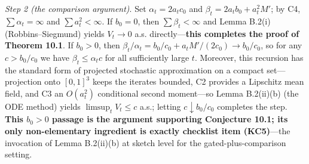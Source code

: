 \documentclass[
  11pt]{article}
\begin{document}
\emph{Step 2 (the comparison argument)}. Set \(\alpha_t = 2a_tc_0\) and
\(\beta_t = 2a_tb_0 + a_t^2 M'\); by C4, \(\sum\alpha_t = \infty\) and
\(\sum a_t^2 < \infty\). If \(b_0 = 0\), then \(\sum\beta_t < \infty\)
and Lemma B.2(i) (Robbins--Siegmund) yields \(V_t \to 0\) a.s.
directly---\textbf{this completes the proof of Theorem 10.1}. If
\(b_0 > 0\), then
\(\beta_t/\alpha_t = b_0/c_0 + a_tM'/(2c_0) \to b_0/c_0\), so for any
\(c > b_0/c_0\) we have \(\beta_t \le \alpha_t c\) for all sufficiently
large \(t\). Moreover, this recursion has the standard form of projected
stochastic approximation on a compact set---projection onto \([0,1]^3\)
keeps the iterates bounded, C2 provides a Lipschitz mean field, and C3
an \(O(a_t^2)\) conditional second moment---so Lemma B.2(ii)(b) (the ODE
method) yields \(\limsup_t V_t \le c\) a.s.; letting
\(c \downarrow b_0/c_0\) completes the step. \textbf{This \(b_0>0\)
passage is the argument supporting Conjecture 10.1; its only
non-elementary ingredient is exactly checklist item (KC5)}---the
invocation of Lemma B.2(ii)(b) at sketch level for the
gated-plus-comparison setting.
\end{document}
